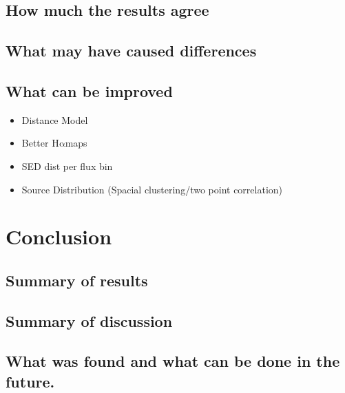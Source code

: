 \documentclass[a4paper]{article}
\def\halpha{$\mathrm{H\alpha}$\;}
\begin{document}
\subsection{How much the results agree}
\subsection{What may have caused differences}

\subsection{What can be improved}
\begin{itemize}
    \item Distance Model
    \item Better \halpha maps
    \item SED dist per flux bin
    \item Source Distribution (Spacial clustering/two point correlation)
\end{itemize}
\section{Conclusion}
\subsection{Summary of results}
\subsection{Summary of discussion}
\subsection{What was found and what can be done in the future.}




\end{document}
